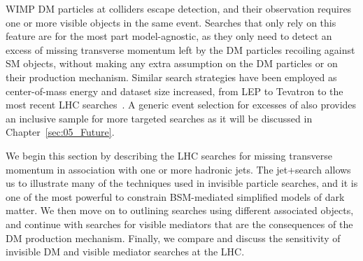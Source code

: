 \begin{textbox}[!h]





\end{textbox}

WIMP DM particles at colliders escape detection, and their observation requires one or more visible objects in the same event. Searches that only rely on this feature are for the most part model-agnostic, as they only need to detect an excess of missing transverse momentum left by the DM particles recoiling against SM objects, without making any extra assumption on the DM particles or on their production mechanism. Similar search strategies have been employed as center-of-mass energy and dataset size increased, from LEP to Tevatron to the most recent LHC searches~\cite{Fox:2011fx,Beltran:2010ww,Bai:2010hh}. A generic event selection for excesses of \MET also provides an inclusive sample for more targeted searches as it will be discussed in Chapter~\ref{sec:05_Future}. 

We begin this section by describing the LHC searches for missing transverse momentum in association with one or more hadronic jets. The jet+\MET search allows us to illustrate many of the techniques used in invisible particle searches, and it is one of the most powerful to constrain BSM-mediated simplified models of dark matter. We then move on to outlining searches using different associated objects, and continue with searches for visible mediators that are the consequences of the DM production mechanism. Finally, we compare and discuss the sensitivity of invisible DM and visible mediator searches at the LHC. 

